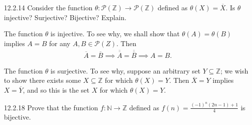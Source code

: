 \documentclass{exam}
\begin{document}
\begin{problem}{12.2.14}
    Consider the function $\theta:\mathscr P(\mathbb Z)\rightarrow\mathscr P(\mathbb Z)$ defined as $\theta(X) = \overline{X}$. Is $\theta$ injective? Surjective? Bijective? Explain.
\end{problem}

The function $\theta$ is injective. To see why, we shall show that $\theta(A) = \theta(B)$ implies $A = B$ for any $A, B\in\mathscr P(Z)$. Then
\begin{align*}
    \overline A = \overline B \implies \overline{\overline A} = \overline{\overline B} \implies A = B.
\end{align*}

The function $\theta$ is surjective. To see why, suppose an arbitrary set $Y\subseteq \mathbb Z$; we wish to show there exists some $X\subseteq\mathbb Z$ for which $\theta(X) = Y$. Then $\overline X = Y$ implies $X = \overline Y$, and so this is the set $X$ for which $\theta(X) = Y$.

\begin{problem}{12.2.18}
    Prove that the function $f:\mathbb N\rightarrow\mathbb Z$ defined as $f(n)=\frac{(-1)^n(2n-1)+1}4$ is bijective.
\end{problem}
\end{document}
